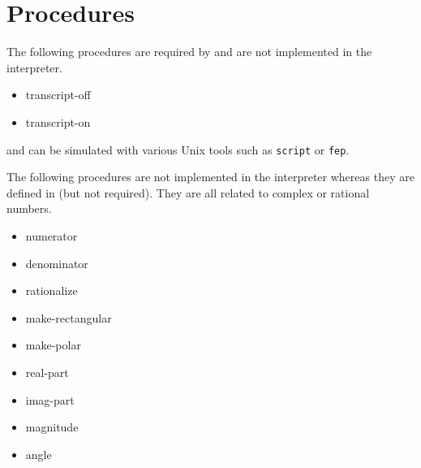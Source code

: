 \section{Procedures}

The following procedures are required by {\rrrr} and are not implemented in the
{\stk} interpreter.
\begin{itemize}
\item{transcript-off}
\item{transcript-on}
\end{itemize}

 and  can be simulated with 
various Unix tools such as {\tt script} or {\tt fep}.

\vskip3mm
The following procedures are not implemented in the {\stk} interpreter whereas
they are defined in {\rrrr} (but not required). They are all 
related to complex or rational numbers.
\begin{itemize}
\item{numerator}
\item{denominator}
\item{rationalize}
\item{make-rectangular}
\item{make-polar}
\item{real-part}
\item{imag-part}
\item{magnitude}
\item{angle}
\end{itemize}



